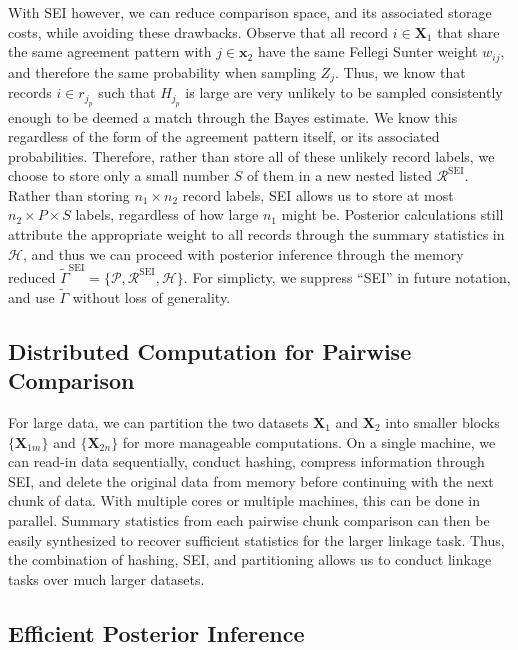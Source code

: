 \documentclass[12pt,letterpaper]{article}
\newcommand{\1}[1]{\mathbb{I}\!\left[#1\right]} %
\begin{document}
With SEI however, we can reduce comparison space, and its associated storage costs, while avoiding these drawbacks. Observe that all record $i \in \bm{X}_1$ that share the same agreement pattern with $j \in \bm{x}_2$ have the same Fellegi Sunter weight $w_{ij}$, and therefore the same probability when sampling \(Z_j\). Thus, we know that records $i \in r_{j_p}$  such that $H_{j_p}$ is large are very unlikely to be sampled consistently enough to be deemed a match through the Bayes estimate. We know this regardless of the form of the agreement pattern itself, or its associated probabilities. Therefore, rather than store all of these unlikely record labels, we choose to store only a small number \(S\) of them in a new nested listed $\mathcal{R}^{\text{SEI}}$. Rather than storing \(n_1 \times n_2\) record labels, SEI allows us to store at most
\(n_2 \times P \times S\) labels, regardless of how large \(n_1\) might be. Posterior calculations still attribute the appropriate weight to all records through the summary statistics in $\mathcal{H}$, and thus we can proceed with posterior inference through the memory reduced $\tilde{\Gamma}^{\text{SEI}} = \{\mathcal{P}, \mathcal{R}^{\text{SEI}}, \mathcal{H}\}$. For simplicty, we suppress ``SEI'' in future notation, and use $\tilde{\Gamma}$ without loss of generality. 

\hypertarget{distributed}{%
	\subsection{Distributed Computation for Pairwise Comparison}\label{distributed}}

For large data, we can partition the two datasets \(\bm{X}_1\) and
\(\bm{X}_2\) into smaller blocks \(\{\bm{X}_{1m}\}\) and \(\{\bm{X}_{2n}\}\) for more
manageable computations. On a single machine, we can read-in data
sequentially, conduct hashing, compress information through SEI, and
delete the original data from memory before continuing with the next
chunk of data. With multiple cores or multiple machines, this can be
done in parallel. Summary statistics from each pairwise chunk comparison can then be easily synthesized to recover sufficient statistics for the larger linkage task.  Thus, the combination of hashing, SEI, and partitioning
allows us to conduct linkage tasks over much larger datasets.

\hypertarget{efficient-posterior}{%
	\subsection{Efficient Posterior Inference }\label{efficient-posterior}}
\end{document}
